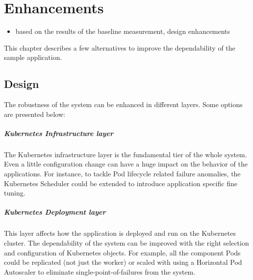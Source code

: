 \chapter{Enhancements} \label{enhancements}

\begin{itemize}
	\item based on the results of the baseline measurement, design enhancements
\end{itemize}

This chapter describes a few alternatives to improve the dependability of the sample application.

\section{Design}


The robustness of the system can be enhanced in different layers. Some options are presented below:

\paragraph{Kubernetes Infrastructure layer} The Kubernetes infrastructure layer is the fundamental tier of the whole system. Even a little configuration change can have a huge impact on the behavior of the applications. For instance, to tackle Pod lifecycle related failure anomalies, the Kubernetes Scheduler could be extended to introduce application specific fine tuning.

\paragraph{Kubernetes Deployment layer} This layer affects how the application is deployed and run on the Kubernetes cluster. The dependability of the system can be improved with the right selection and configuration of Kubernetes objects. For example, all the component Pods could be replicated (not just the worker) or scaled with using a Horizontal Pod Autoscaler to eliminate single-point-of-failures from the system.

